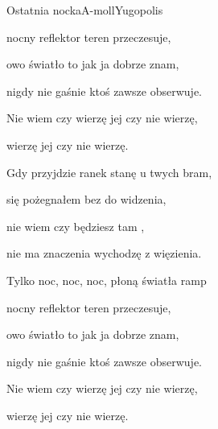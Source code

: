 \begin{song}{Ostatnia nocka}{A-moll}{}{Yugopolis}{}{}
\begin{SBVerse}
    nocny reflektor teren przeczesuje,

    owo światło to jak ja dobrze znam,

    nigdy nie gaśnie ktoś zawsze obserwuje.
  \end{SBVerse}
  \begin{SBChorus}
    Nie wiem czy wierzę jej czy nie wierzę,

    wierzę jej czy nie wierzę.
  \end{SBChorus}
  \begin{SBVerse}
    Gdy przyjdzie ranek stanę u twych bram,

    się pożegnałem bez do widzenia,

    nie wiem czy będziesz tam ,

    nie ma znaczenia wychodzę z więzienia.
  \end{SBVerse}
  \begin{SBVerse}
    Tylko noc, noc, noc, płoną światła ramp

    nocny reflektor teren przeczesuje,

    owo światło to jak ja dobrze znam,

    nigdy nie gaśnie ktoś zawsze obserwuje.
  \end{SBVerse}
  \begin{SBChorus}
    Nie wiem czy wierzę jej czy nie wierzę,

    wierzę jej czy nie wierzę.
  \end{SBChorus}
\end{song}
